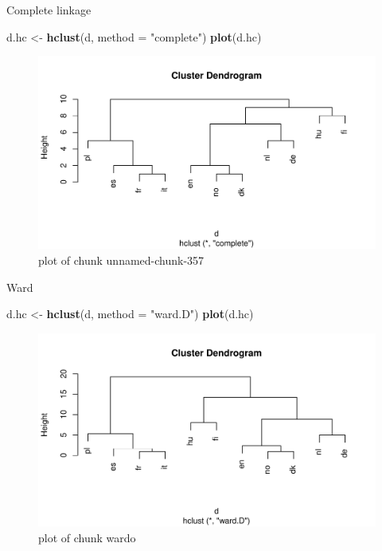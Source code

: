 \documentclass[ignorenonframetext,]{beamer}
\newenvironment{Shaded}{\begin{snugshade}}{\end{snugshade}}
\newcommand{\DataTypeTok}[1]{\textcolor[rgb]{0.13,0.29,0.53}{#1}}
\newcommand{\KeywordTok}[1]{\textcolor[rgb]{0.13,0.29,0.53}{\textbf{#1}}}
\newcommand{\NormalTok}[1]{#1}
\newcommand{\StringTok}[1]{\textcolor[rgb]{0.31,0.60,0.02}{#1}}
\begin{document}
\begin{frame}[fragile]{Complete linkage}
\protect\hypertarget{complete-linkage-1}{}

\begin{Shaded}
\begin{Highlighting}[]
\NormalTok{d.hc <-}\StringTok{ }\KeywordTok{hclust}\NormalTok{(d, }\DataTypeTok{method =} \StringTok{"complete"}\NormalTok{)}
\KeywordTok{plot}\NormalTok{(d.hc)}
\end{Highlighting}
\end{Shaded}

\begin{figure}
\centering
\includegraphics{figure/unnamed-chunk-357-1.pdf}
\caption{plot of chunk unnamed-chunk-357}
\end{figure}

\end{frame}

\begin{frame}[fragile]{Ward}
\protect\hypertarget{ward}{}

\begin{Shaded}
\begin{Highlighting}[]
\NormalTok{d.hc <-}\StringTok{ }\KeywordTok{hclust}\NormalTok{(d, }\DataTypeTok{method =} \StringTok{"ward.D"}\NormalTok{)}
\KeywordTok{plot}\NormalTok{(d.hc)}
\end{Highlighting}
\end{Shaded}

\begin{figure}
\centering
\includegraphics{figure/wardo-1.pdf}
\caption{plot of chunk wardo}
\end{figure}

\end{frame}
\end{document}
